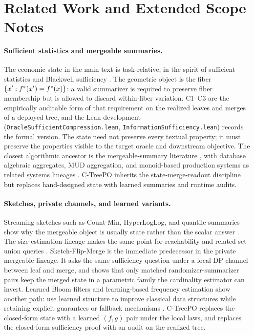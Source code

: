 \section{Related Work and Extended Scope Notes}\label{app:min-related}

\paragraph{Sufficient statistics and mergeable summaries.}
The economic state in the main text is task-relative, in the spirit of
sufficient statistics and Blackwell sufficiency
\citep{Fisher1922,Blackwell1953,Torgersen1991}. The geometric object is the fiber
$\{x':f^\ast(x')=f^\ast(x)\}$: a valid summarizer is required to
preserve fiber membership but is allowed to discard within-fiber
variation. C1--C3 are the empirically auditable form of that
requirement on the realized leaves and merges of a deployed tree, and
the Lean development (\texttt{OracleSufficientCompression.lean},
\texttt{InformationSufficiency.lean}) records the formal version. The
state need not preserve every textual property; it must preserve the
properties visible to the target oracle and downstream objective.
The closest algorithmic ancestor is the mergeable-summary literature
\citep{Agarwal2013MergeableTODS}, with database algebraic aggregates, MUD
aggregation, and monoid-based production systems as related systems lineages
\citep{GrayEtAl1997DataCube,FeldmanEtAl2008MUD,BoykinEtAl2014Summingbird}.
C-TreePO inherits the state-merge-readout discipline but replaces
hand-designed state with learned summaries and runtime audits.

\paragraph{Sketches, private channels, and learned variants.}
Streaming sketches such as Count-Min, HyperLogLog, and quantile summaries show
why the mergeable object is usually state rather than the scalar answer
\citep{FlajoletEtAl2007,CormodeMuthukrishnan2005,GreenwaldKhanna2001}. The
size-estimation lineage makes the same point for reachability and related
set-union queries \citep{Cohen1997SizeEstimation}. Sketch-Flip-Merge
\citep{HehirTingCormode2023SFM} is the immediate predecessor in the private
mergeable lineage. It asks the same sufficiency question under a local-DP
channel between leaf and merge, and shows that only matched
randomizer-summarizer pairs keep the merged state in a parametric family the
cardinality estimator can invert. Learned Bloom filters and learning-based
frequency estimation show another path: use learned structure to improve
classical data structures while retaining explicit guarantees or fallback
mechanisms \citep{Mitzenmacher2018LearnedBloom,HsuEtAl2019Frequency}.
C-TreePO replaces the closed-form state with a learned $(f,g)$ pair under the
local laws, and replaces the closed-form sufficiency proof with an audit on
the realized tree.

